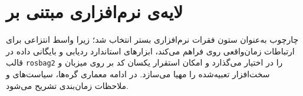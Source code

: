 %	
%	
%	
%	
%	
	
	
	\section{لایه‌ی نرم‌افزاری مبتنی بر }\label{sec:hil_ros2}
	
	چارچوب  به‌عنوان ستون فقرات نرم‌افزاری بستر  انتخاب شد؛ زیرا واسط انتزاعی برای ارتباطات زمان‌واقعی روی  فراهم می‌کند، ابزارهای استاندارد ردیابی و بایگانی داده در قالب \texttt{rosbag2} را در اختیار می‌گذارد و امکان استقرار یکسان کد بر روی میزبان
	 {و}
	  سخت‌افزار تعبیه‌شده را مهیا می‌سازد. در ادامه معماری گره‌ها، سیاست‌های  و ملاحظات زمان‌بندی تشریح می‌شود.
	
